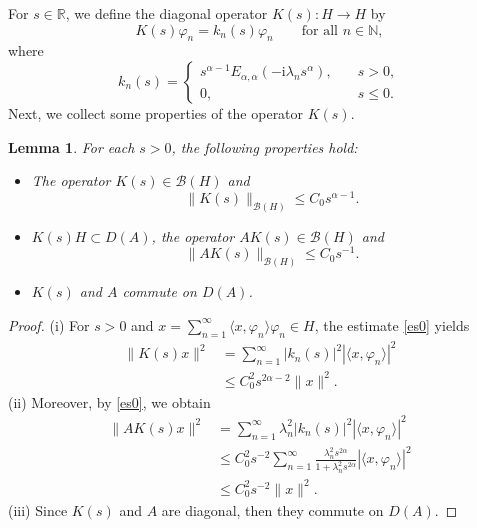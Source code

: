 \documentclass[reqno]{amsart}
\newtheorem{lem}[theorem]{Lemma}
\numberwithin{equation}{section}
\begin{document}
For $s\in\mathbb{R}$, we define the diagonal operator $K(s): H\to H$ by
\begin{equation}\label{dfks}
K(s)\varphi_n = k_n(s)\varphi_n \qquad \text{for all } n\in \mathbb{N},
\end{equation}
where $$k_n(s)=\begin{cases}
    s^{\alpha-1} E_{\alpha,\alpha}(-\mathrm{i}\lambda_n s^\alpha),\quad &s>0,\\
    0,\quad &s\leq 0.
\end{cases} $$
Next, we collect some properties of the operator $K(s)$. 
\begin{lem}\label{lmks} For each $s>0$, the following properties hold:
\begin{itemize}
    \item[(i)] The operator $K(s)\in\mathcal{B}(H)$ and 
\begin{equation}\label{estks}
\|K(s)\|_{\mathcal{B}(H)}\le C_0 s^{\alpha-1}.
\end{equation}
\item[(ii)] $K(s)H\subset D(A)$, the operator $AK(s)\in \mathcal{B}(H)$ and
\begin{equation}
\|AK(s)\|_{\mathcal{B}(H)}\le C_0 s^{-1}.
\end{equation}
\item[(iii)] $K(s)$ and $A$ commute on $D(A)$.
\end{itemize}
\end{lem}
\begin{proof}
(i) For $s>0$ and $x=\displaystyle\sum_{n=1}^\infty \langle x,\varphi_n\rangle \varphi_n \in H$, the estimate \eqref{es0} yields
\begin{align*}
\|K(s)x\|^2 &= \sum_{n=1}^\infty |k_n(s)|^2 |\langle x,\varphi_n\rangle|^2\\
& \leq C_0^2 s^{2\alpha-2}\|x\|^2.
\end{align*}
(ii) Moreover, by \eqref{es0}, we obtain
\begin{align*}
\|AK(s)x\|^2 &= \sum_{n=1}^\infty \lambda_n^2 |k_n(s)|^2 |\langle x,\varphi_n\rangle|^2\\
&\le C_0^2 s^{-2} \sum_{n=1}^\infty\frac{\lambda_n^2 s^{2\alpha}}{1+\lambda_n^2 s^{2\alpha}}|\langle x,\varphi_n\rangle|^2\\
& \leq C_0^2 s^{-2}\|x\|^2.
\end{align*}
(iii) Since $K(s)$ and $A$ are diagonal, then they commute on $D(A)$.
\end{proof}
\end{document}
